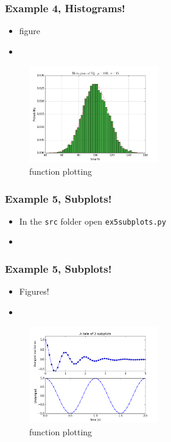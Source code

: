 \documentclass{beamer}
\begin{document}
\begin{frame}
\frametitle{Example 4, Histograms!}
\begin{itemize}
\item figure
\item
\end{itemize}
\begin{figure}
	\centering
	\includegraphics[width=0.5\textwidth]{ex4.png}
	\caption{function plotting}
	\label{fig:function}
\end{figure}
\end{frame}

\begin{frame}
\frametitle{Example 5, Subplots!}
\begin{itemize}
\item In the \texttt{src} folder open \texttt{ex5subplots.py} 
\item
\end{itemize}
\end{frame}

\begin{frame}
\frametitle{Example 5, Subplots!}
\begin{itemize}
\item Figures!
\item
\end{itemize}
\begin{figure}
	\centering
	\includegraphics[width=0.5\textwidth]{ex5.png}
	\caption{function plotting}
	\label{fig:function}
\end{figure}
\end{frame}
\end{document}
